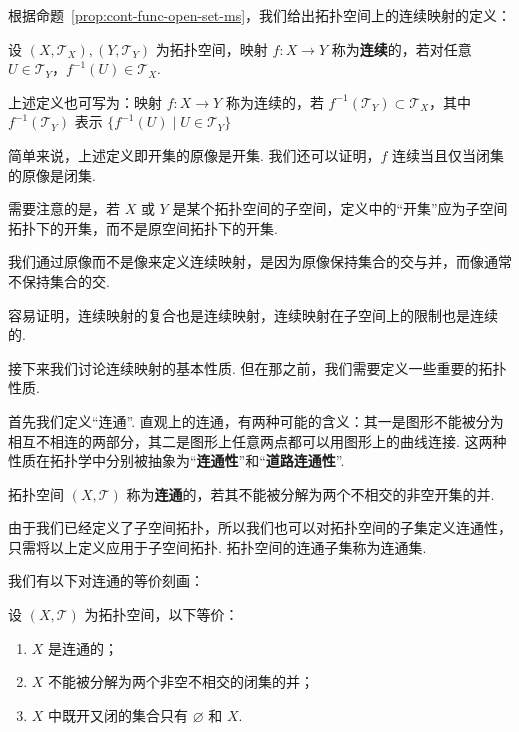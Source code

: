 \documentclass[../main.tex]{subfiles}
\begin{document}
根据命题~\ref{prop:cont-func-open-set-ms}，我们给出拓扑空间上的连续映射的定义：

\begin{definition}[拓扑空间上的连续映射的定义] \label{def:continuous-map-topo}
    设 $(X, \mathcal{T}_X), (Y, \mathcal{T}_Y)$ 为拓扑空间，映射 $f:X \to Y$ 称为\textbf{连续}的，若对任意 $U \in \mathcal{T}_Y$，$f^{-1}(U) \in \mathcal{T}_X$. 
\end{definition}

\begin{remark}
    上述定义也可写为：映射 $f:X \to Y$ 称为连续的，若 $f^{-1}(\mathcal{T}_Y) \subset \mathcal{T}_X$，其中 $f^{-1}(\mathcal{T}_Y)$ 表示 $\{f^{-1}(U) \mid U \in \mathcal{T}_Y\}$

    简单来说，上述定义即开集的原像是开集. 我们还可以证明，$f$ 连续当且仅当闭集的原像是闭集. 

    需要注意的是，若 $X$ 或 $Y$ 是某个拓扑空间的子空间，定义中的“开集”应为子空间拓扑下的开集，而不是原空间拓扑下的开集. 

    我们通过原像而不是像来定义连续映射，是因为原像保持集合的交与并，而像通常不保持集合的交. 
\end{remark}

容易证明，连续映射的复合也是连续映射，连续映射在子空间上的限制也是连续的. 

接下来我们讨论连续映射的基本性质. 但在那之前，我们需要定义一些重要的拓扑性质. 

首先我们定义“连通”. 直观上的连通，有两种可能的含义：其一是图形不能被分为相互不相连的两部分，其二是图形上任意两点都可以用图形上的曲线连接. 这两种性质在拓扑学中分别被抽象为“\textbf{连通性}”和“\textbf{道路连通性}”. 

\begin{definition}[连通的定义]
    拓扑空间 $(X, \mathcal{T})$ 称为\textbf{连通}的，若其不能被分解为两个不相交的非空开集的并. 
\end{definition}

\begin{remark}
    由于我们已经定义了子空间拓扑，所以我们也可以对拓扑空间的子集定义连通性，只需将以上定义应用于子空间拓扑. 拓扑空间的连通子集称为连通集. 
\end{remark}

我们有以下对连通的等价刻画：

\begin{proposition}[连通的等价刻画]
    设 $(X, \mathcal{T})$ 为拓扑空间，以下等价：
    \begin{enumerate}[label = (\alph*)]
        \item $X$ 是连通的；
        \item $X$ 不能被分解为两个非空不相交的闭集的并；
        \item $X$ 中既开又闭的集合只有 $\varnothing$ 和 $X$. 
    \end{enumerate}
\end{proposition}
\end{document}
